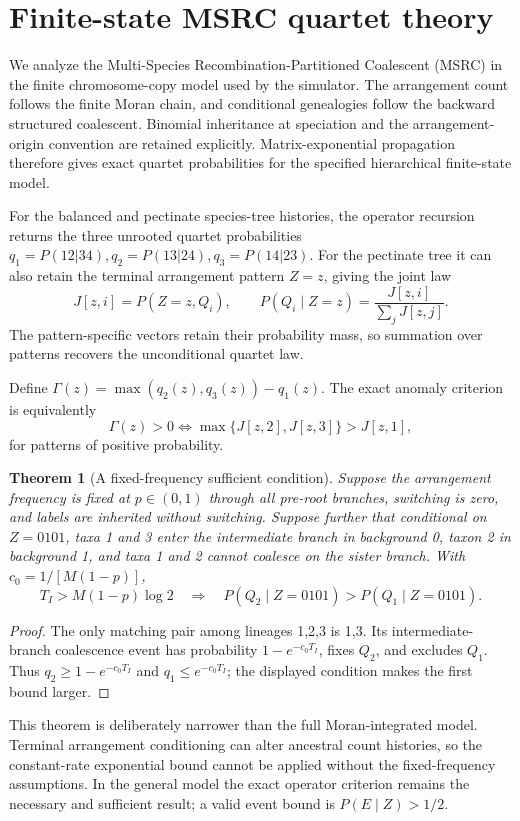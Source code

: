 \documentclass[11pt]{article}
\newtheorem{theorem}{Theorem}
\begin{document}
\section*{Finite-state MSRC quartet theory}

We analyze the Multi-Species Recombination-Partitioned Coalescent (MSRC) in
the finite chromosome-copy model used by the simulator. The arrangement count
follows the finite Moran chain, and conditional genealogies follow the
backward structured coalescent. Binomial inheritance at speciation and the
arrangement-origin convention are retained explicitly. Matrix-exponential
propagation therefore gives exact quartet probabilities for the specified
hierarchical finite-state model.

For the balanced and pectinate species-tree histories, the operator recursion
returns the three unrooted quartet probabilities
\(q_1=P(12|34),q_2=P(13|24),q_3=P(14|23)\). For the pectinate tree it can also
retain the terminal arrangement pattern \(Z=z\), giving the joint law
\[
J[z,i]=P(Z=z,Q_i),\qquad
P(Q_i\mid Z=z)=\frac{J[z,i]}{\sum_jJ[z,j]}.
\]
The pattern-specific vectors retain their probability mass, so summation over
patterns recovers the unconditional quartet law.

Define \(\Gamma(z)=\max(q_2(z),q_3(z))-q_1(z)\). The exact anomaly criterion
is equivalently
\[
\Gamma(z)>0\iff \max\{J[z,2],J[z,3]\}>J[z,1],
\]
for patterns of positive probability.

\begin{theorem}[A fixed-frequency sufficient condition]
Suppose the arrangement frequency is fixed at \(p\in(0,1)\) through all
pre-root branches, switching is zero, and labels are inherited without
switching. Suppose further that conditional on \(Z=0101\), taxa 1 and 3
enter the intermediate branch in background 0, taxon 2 in background 1, and
taxa 1 and 2 cannot coalesce on the sister branch. With
\(c_0=1/[M(1-p)]\),
\[
T_I>M(1-p)\log2
\quad\Longrightarrow\quad
P(Q_2\mid Z=0101)>P(Q_1\mid Z=0101).
\]
\end{theorem}

\begin{proof}
The only matching pair among lineages 1,2,3 is 1,3. Its intermediate-branch
coalescence event has probability \(1-e^{-c_0T_I}\), fixes \(Q_2\), and excludes
\(Q_1\). Thus \(q_2\ge1-e^{-c_0T_I}\) and \(q_1\le e^{-c_0T_I}\); the displayed
condition makes the first bound larger.
\end{proof}

This theorem is deliberately narrower than the full Moran-integrated model.
Terminal arrangement conditioning can alter ancestral count histories, so the
constant-rate exponential bound cannot be applied without the fixed-frequency
assumptions. In the general model the exact operator criterion remains the
necessary and sufficient result; a valid event bound is \(P(E\mid Z)>1/2\).
\end{document}
